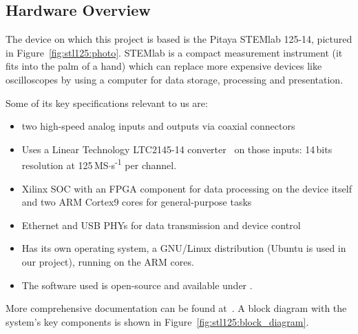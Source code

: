 \subsection{Hardware Overview} %
\label{subsec:stl125:hardware_overview}

The  device on  which this  project  is based  is the  Pitaya STEMlab  125-14,
pictured  in Figure~\ref{fig:stl125:photo}. STEMlab  is a  compact measurement
instrument (it fits into the palm of  a hand) which can replace more expensive
devices like  oscilloscopes by using  a computer for data  storage, processing
and presentation.

Some of its key specifications relevant to us are:
\begin{itemize}\tightlist
    \item
        two high-speed analog inputs and outputs via coaxial connectors
    \item
        Uses  a  Linear Technology  LTC2145-14  converter~\cite{lt:ltc2145-14}
        on      those      inputs:      \num{14}\,bits      resolution      at
        \num{125}\,MS$\cdot$s\textsuperscript{-1} per channel.
    \item
        Xilinx SOC  with an FPGA component  for data processing on  the device
        itself and two ARM Cortex9 cores for general-purpose tasks
    \item
        Ethernet and USB PHYs for data transmission and device control
    \item
        Has its own operating system, a GNU/Linux distribution (Ubuntu is used
        in our project), running on the ARM cores.
    \item
        The software used is open-source and available under \cite{pita:github}.
\end{itemize}
More  comprehensive documentation  can be  found at~\cite{pita:readthedocs}. A
block   diagram   with    the   system's   key   components    is   shown   in
Figure~\ref{fig:stl125:block_diagram}.

